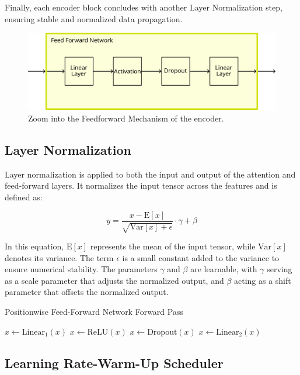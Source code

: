 Finally, each encoder block concludes with another Layer Normalization step, ensuring stable and normalized data propagation.

\begin{figure}[t]
    \centering
    \includegraphics[width=\textwidth]{contents/Basics/FeedforwardNetwork.png}
    \caption{Zoom into the Feedforward Mechanism of the encoder.}
    \label{fig:ffn}
\end{figure}

\subsection{Layer Normalization}
\label{sec:laynorm}
Layer normalization is applied to both the input and output of the attention and feed-forward layers. It normalizes the input tensor across the features and is defined as:

\begin{equation}
\label{eq:layernorm}
    y = \frac{x - \text{E}[x]}{\sqrt{\text{Var}[x] + \epsilon}} \cdot \gamma + \beta
\end{equation}

In this equation, \( \text{E}[x] \) represents the mean of the input tensor, while \( \text{Var}[x] \) denotes its variance. The term \( \epsilon \) is a small constant added to the variance to ensure numerical stability. The parameters \( \gamma \) and \( \beta \) are learnable, with \( \gamma \) serving as a scale parameter that adjusts the normalized output, and \( \beta \) acting as a shift parameter that offsets the normalized output.

\begin{algorithm}[H]
\caption{Positionwise Feed-Forward Network Forward Pass}
\label{alg:ffn2}
$x \gets \text{Linear}_1(x)$\;
$x \gets \text{ReLU}(x)$\;
$x \gets \text{Dropout}(x)$\;
$x \gets \text{Linear}_2(x)$\;
\end{algorithm}


\subsection{Learning Rate-Warm-Up Scheduler}
\label{sec:scheduler}

